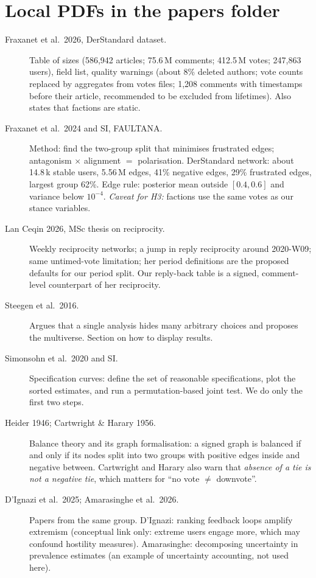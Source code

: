 \section{Local PDFs in the papers folder}
\begin{description}
  \item[Fraxanet et al.\ 2026, DerStandard dataset.] Table of sizes (586,942 articles; 75.6\,M comments; 412.5\,M votes; 247,863 users), field list, quality warnings (about 8\% deleted authors; vote counts replaced by aggregates from votes files; 1,208 comments with timestamps before their article, recommended to be excluded from lifetimes). Also states that factions are static.
  \item[Fraxanet et al.\ 2024 and SI, FAULTANA.] Method: find the two-group split that minimises frustrated edges; antagonism $\times$ alignment $=$ polarisation. DerStandard network: about 14.8\,k stable users, 5.56\,M edges, 41\% negative edges, 29\% frustrated edges, largest group 62\%. Edge rule: posterior mean outside $[0.4,0.6]$ and variance below $10^{-4}$. \emph{Caveat for H3:} factions use the same votes as our stance variables.
  \item[Lan Ceqin 2026, MSc thesis on reciprocity.] Weekly reciprocity networks; a jump in reply reciprocity around 2020-W09; same untimed-vote limitation; her period definitions are the proposed defaults for our period split. Our reply-back table is a signed, comment-level counterpart of her reciprocity.
  \item[Steegen et al.\ 2016.] Argues that a single analysis hides many arbitrary choices and proposes the multiverse. Section on how to display results.
  \item[Simonsohn et al.\ 2020 and SI.] Specification curves: define the set of reasonable specifications, plot the sorted estimates, and run a permutation-based joint test. We do only the first two steps.
  \item[Heider 1946; Cartwright \& Harary 1956.] Balance theory and its graph formalisation: a signed graph is balanced if and only if its nodes split into two groups with positive edges inside and negative between. Cartwright and Harary also warn that \emph{absence of a tie is not a negative tie}, which matters for ``no vote $\ne$ downvote''.
  \item[D'Ignazi et al.\ 2025; Amarasinghe et al.\ 2026.] Papers from the same group. D'Ignazi: ranking feedback loops amplify extremism (conceptual link only: extreme users engage more, which may confound hostility measures). Amarasinghe: decomposing uncertainty in prevalence estimates (an example of uncertainty accounting, not used here).
\end{description}


